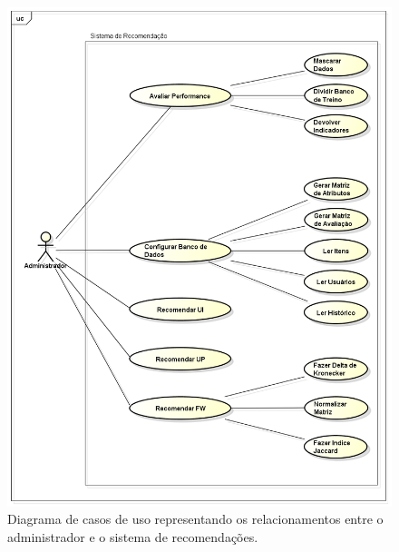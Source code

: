  \begin{figure}[htp]
    \begin{center}
    \includegraphics[width=1\textwidth]{img/CasosDeUso}
    \end{center}
    \label{fig:Diagrama de Casos de Uso}
    \caption{Diagrama de casos de uso representando os relacionamentos entre o administrador e o sistema de recomendações.}
\end{figure}